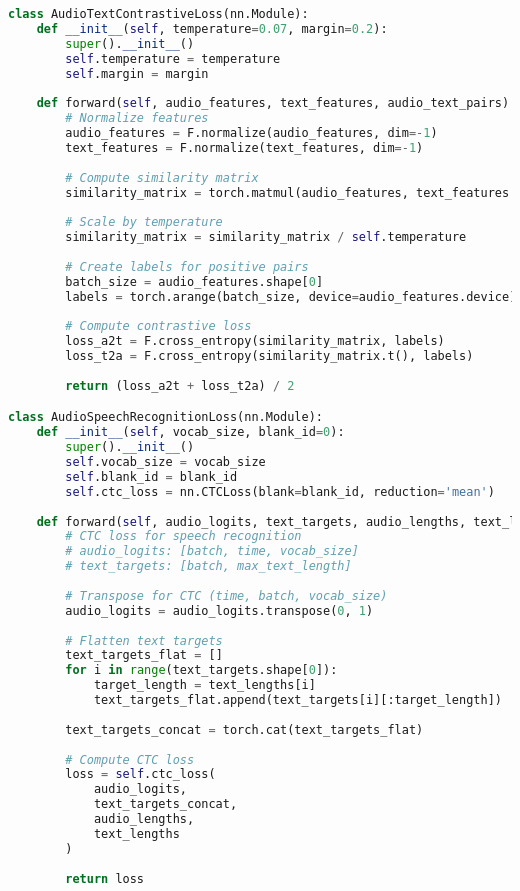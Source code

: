 \begin{lstlisting}[language=Python, caption=Audio-text contrastive learning]
class AudioTextContrastiveLoss(nn.Module):
    def __init__(self, temperature=0.07, margin=0.2):
        super().__init__()
        self.temperature = temperature
        self.margin = margin
        
    def forward(self, audio_features, text_features, audio_text_pairs):
        # Normalize features
        audio_features = F.normalize(audio_features, dim=-1)
        text_features = F.normalize(text_features, dim=-1)
        
        # Compute similarity matrix
        similarity_matrix = torch.matmul(audio_features, text_features.t())
        
        # Scale by temperature
        similarity_matrix = similarity_matrix / self.temperature
        
        # Create labels for positive pairs
        batch_size = audio_features.shape[0]
        labels = torch.arange(batch_size, device=audio_features.device)
        
        # Compute contrastive loss
        loss_a2t = F.cross_entropy(similarity_matrix, labels)
        loss_t2a = F.cross_entropy(similarity_matrix.t(), labels)
        
        return (loss_a2t + loss_t2a) / 2

class AudioSpeechRecognitionLoss(nn.Module):
    def __init__(self, vocab_size, blank_id=0):
        super().__init__()
        self.vocab_size = vocab_size
        self.blank_id = blank_id
        self.ctc_loss = nn.CTCLoss(blank=blank_id, reduction='mean')
        
    def forward(self, audio_logits, text_targets, audio_lengths, text_lengths):
        # CTC loss for speech recognition
        # audio_logits: [batch, time, vocab_size]
        # text_targets: [batch, max_text_length]
        
        # Transpose for CTC (time, batch, vocab_size)
        audio_logits = audio_logits.transpose(0, 1)
        
        # Flatten text targets
        text_targets_flat = []
        for i in range(text_targets.shape[0]):
            target_length = text_lengths[i]
            text_targets_flat.append(text_targets[i][:target_length])
        
        text_targets_concat = torch.cat(text_targets_flat)
        
        # Compute CTC loss
        loss = self.ctc_loss(
            audio_logits,
            text_targets_concat,
            audio_lengths,
            text_lengths
        )
        
        return loss
\end{lstlisting}

